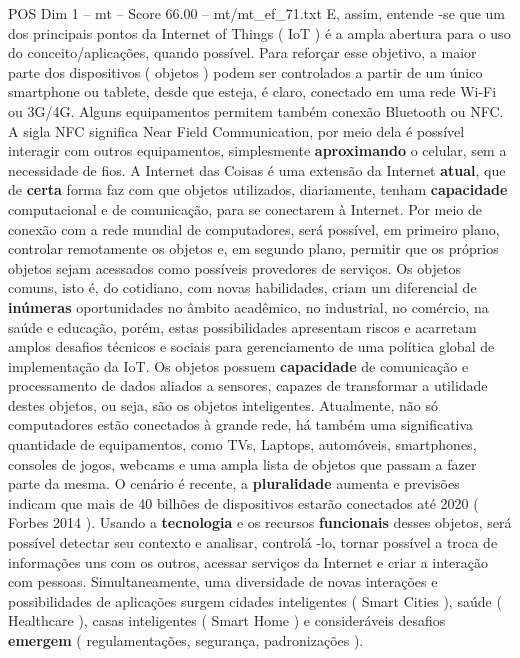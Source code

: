 \begin{textsample}{POS Dim 1 – mt – Score 66.00 – mt/mt\_ef\_71.txt}
E, assim, entende -se que um dos principais pontos da Internet of Things ( IoT ) é a ampla abertura para o uso do conceito/aplicações, quando possível.
Para reforçar esse objetivo, a maior parte dos dispositivos ( objetos ) podem ser controlados a partir de um único smartphone ou tablete, desde que esteja, é claro, conectado em uma rede Wi-Fi ou 3G/4G.
Alguns equipamentos permitem também conexão Bluetooth ou NFC.
A sigla NFC significa Near Field Communication, por meio dela é possível interagir com outros equipamentos, simplesmente \textbf{aproximando} o celular, sem a necessidade de fios.
A Internet das Coisas é uma extensão da Internet \textbf{atual}, que de \textbf{certa} forma faz com que objetos utilizados, diariamente, tenham \textbf{capacidade} computacional e de comunicação, para se conectarem à Internet.
Por meio de conexão com a rede mundial de computadores, será possível, em primeiro plano, controlar remotamente os objetos e, em segundo plano, permitir que os próprios objetos sejam acessados como possíveis provedores de serviços.
Os objetos comuns, isto é, do cotidiano, com novas habilidades, criam um diferencial de \textbf{inúmeras} oportunidades no âmbito acadêmico, no industrial, no comércio, na saúde e educação, porém, estas possibilidades apresentam riscos e acarretam amplos desafios técnicos e sociais para gerenciamento de uma política global de implementação da IoT.
Os objetos possuem \textbf{capacidade} de comunicação e processamento de dados aliados a sensores, capazes de transformar a utilidade destes objetos, ou seja, são os objetos inteligentes.
Atualmente, não só computadores estão conectados à grande rede, há também uma significativa quantidade de equipamentos, como TVs, Laptops, automóveis, smartphones, consoles de jogos, webcams e uma ampla lista de objetos que passam a fazer parte da mesma.
O cenário é recente, a \textbf{pluralidade} aumenta e previsões indicam que mais de 40 bilhões de dispositivos estarão conectados até 2020 ( Forbes 2014 ).
Usando a \textbf{tecnologia} e os recursos \textbf{funcionais} desses objetos, será possível detectar seu contexto e analisar, controlá -lo, tornar possível a troca de informações uns com os outros, acessar serviços da Internet e criar a interação com pessoas.
Simultaneamente, uma diversidade de novas interações e possibilidades de aplicações surgem cidades inteligentes ( Smart Cities ), saúde ( Healthcare ), casas inteligentes ( Smart Home ) e consideráveis desafios \textbf{emergem} ( regulamentações, segurança, padronizações ).

\end{textsample}
